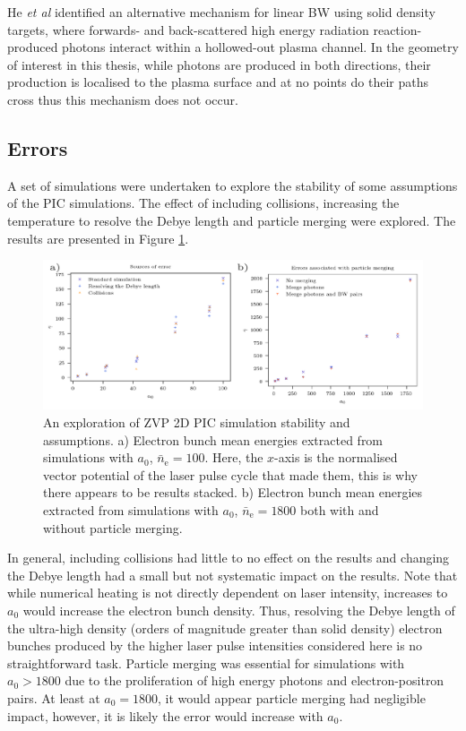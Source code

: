 He \textit{et al} \cite{heSinglelaserSchemeObservation2021} identified an alternative mechanism for linear \ac{BW} using solid density targets, where forwards- and back-scattered high energy radiation reaction-produced photons interact within a hollowed-out plasma channel. In the geometry of interest in this thesis, while photons are produced in both directions, their production is localised to the plasma surface and at no points do their paths cross thus this mechanism does not occur.



\subsection{Errors}
A set of simulations were undertaken to explore the stability of some assumptions of the PIC simulations. The effect of including collisions, increasing the temperature to resolve the Debye length and particle merging were explored. The results are presented in Figure \ref{fig:zvperrorsources}. 
\begin{figure}
	\centering
	\includegraphics[width=1\linewidth]{figures/zvp/zvp_error_sources}
	\caption[An exploration of ZVP 2D PIC simulation stability.]{An exploration of ZVP 2D PIC simulation stability and assumptions. a) Electron bunch mean energies extracted from simulations with $a_0$, $\bar{n}_\mathrm{e} =100$. Here, the $x$-axis is the normalised vector potential of the laser pulse cycle that made them, this is why there appears to be results stacked. b) Electron bunch mean energies extracted from simulations with $a_0$, $\bar{n}_\mathrm{e} =1800$ both with and without particle merging.}
	\label{fig:zvperrorsources}
\end{figure}
In general, including collisions had little to no effect on the results and changing the Debye length had a small but not systematic impact on the results. Note that while numerical heating is not directly dependent on laser intensity, increases to $a_0$ would increase the electron bunch density. Thus, resolving the Debye length of the ultra-high density (orders of magnitude greater than solid density) electron bunches produced by the higher laser pulse intensities considered here is no straightforward task. Particle merging was essential for simulations with $a_0 > 1800$ due to the proliferation of high energy photons and electron-positron pairs. At least at $a_0 = 1800$, it would appear particle merging had negligible impact, however, it is likely the error would increase with $a_0$.

